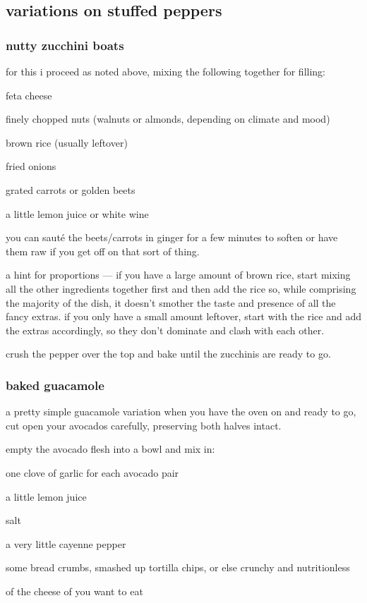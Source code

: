 \subsection{variations on stuffed peppers}

\subsubsection{nutty zucchini boats}

for this i proceed as noted above, mixing the following together for filling:

\begin{ingredients}
  \item feta cheese
  \item finely chopped nuts (walnuts or almonds, depending on climate and mood)
  \item brown rice (usually leftover)
  \item fried onions
  \item grated carrots or golden beets
  \item a little lemon juice or white wine
\end{ingredients}

you can saut\'{e} the beets/carrots in ginger for a few minutes to soften or 
have them raw if you get off on that sort of thing. 

a hint for proportions --- if you have a large amount of brown rice, start 
mixing all the other ingredients together first and then add the rice so, 
while comprising the majority of the dish, it doesn't smother the taste and 
presence of all the fancy extras. if you only have a small amount leftover, 
start with the rice and add the extras accordingly, so they don't dominate and 
clash with each other.

crush the pepper over the top and bake until the zucchinis are ready to go.

\subsubsection{baked guacamole}

a pretty simple guacamole variation when you have the oven on and ready to go, 
cut open your avocados carefully, preserving both halves intact.

empty the avocado flesh into a bowl and mix in:

\begin{ingredients}
  \item one clove of garlic for each avocado pair
  \item a little lemon juice
  \item salt
  \item a very little cayenne pepper
  \item some bread crumbs, smashed up tortilla chips, or  else crunchy and nutritionless
  \item \onehalf of the cheese of you want to eat
\end{ingredients}

